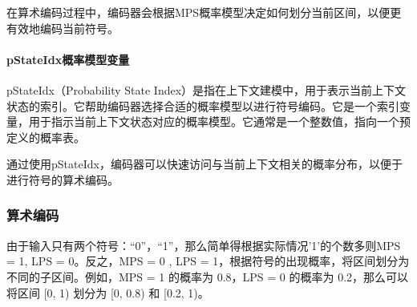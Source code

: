 \documentclass{/Users/hi/Study/template/code}
\begin{document}
在算术编码过程中，编码器会根据MPS概率模型决定如何划分当前区间，以便更有效地编码当前符号。

\paragraph{pStateIdx概率模型变量}
\begin{definition}
	pStateIdx（Probability State Index）是指在上下文建模中，用于表示当前上下文状态的索引。它帮助编码器选择合适的概率模型以进行符号编码。它是一个索引变量，用于指示当前上下文状态对应的概率模型。它通常是一个整数值，指向一个预定义的概率表。
\end{definition}

通过使用pStateIdx，编码器可以快速访问与当前上下文相关的概率分布，以便于进行符号的算术编码。

\subsubsection{算术编码}
由于输入只有两个符号：“0”，“1”，那么简单得根据实际情况'1'的个数多则MPS = 1, LPS = 0。反之，MPS = 0 , LPS = 1，根据符号的出现概率，将区间划分为不同的子区间。例如，MPS = 1 的概率为 0.8，LPS = 0 的概率为 0.2，那么可以将区间 [0, 1) 划分为 [0, 0.8) 和 [0.2, 1)。
\end{document}
